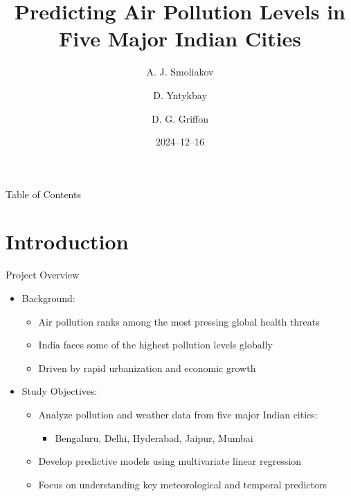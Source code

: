 \documentclass[svgnames, 10pt]{beamer}
\title[Air Pollution in India]{Predicting Air Pollution Levels in Five Major Indian Cities}
\author{A. J. Smoliakov \and D. Yntykbay \and D. G. Griffon}
\institute[VU]{Data Science Study Programme\\Faculty of Mathematics and Informatics}
\date{2024--12--16}
\begin{document}
\begin{frame}
\titlepage
\end{frame}

\begin{frame}{Table of Contents}
\tableofcontents
\end{frame}

\section{Introduction}

\begin{frame}{Project Overview}
    \begin{itemize}
        \item Background:
            \begin{itemize}
                \item Air pollution ranks among the most pressing global health threats
                \item India faces some of the highest pollution levels globally
                \item Driven by rapid urbanization and economic growth
            \end{itemize}
        \vspace{1em}
        \item Study Objectives:
            \begin{itemize}
                \item Analyze pollution and weather data from five major Indian cities:
                    \begin{itemize}
                        \item Bengaluru, Delhi, Hyderabad, Jaipur, Mumbai
                    \end{itemize}
                \item Develop predictive models using multivariate linear regression
                \item Focus on understanding key meteorological and temporal predictors
            \end{itemize}
    \end{itemize}
    \vfill
 \end{frame}
\end{document}

